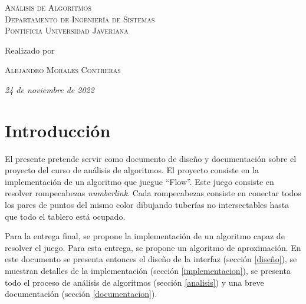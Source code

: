 \documentclass[letter,12pt]{article}
\begin{document}
\begin{titlepage}
	
	{\scshape\Large
	Análisis de Algoritmos \\
	Departamento de Ingeniería de Sistemas \\
	Pontificia Universidad Javeriana \\
	}  %
	
	\vspace*{3\baselineskip} %
	
	
	Realizado por
	
	\vspace{0.5\baselineskip} %
	
	{\scshape\Large Alejandro Morales Contreras} %
	
	\vspace{1\baselineskip} %
	
	\textit{24 de noviembre de 2022} %
	
	\vfill
	
\end{titlepage}

\newpage

\tableofcontents

\newpage

\section{Introducción} \label{introduccion}

El presente pretende servir como documento de diseño y documentación sobre el proyecto del curso de análisis de algoritmos. El proyecto consiste en la implementación de un algoritmo que juegue ``Flow''. Este juego consiste en resolver rompecabezas \emph{numberlink}. Cada rompecabezas consiste en conectar todos los pares de puntos del mismo color dibujando tuberías no intersectables hasta que todo el tablero está ocupado. \par

Para la entrega final, se propone la implementación de un algoritmo capaz de resolver el juego. Para esta entrega, se propone un algoritmo de aproximación. En este documento se presenta entonces el diseño de la interfaz (sección \ref{diseño}), se muestran detalles de la implementación (sección \ref{implementacion}), se presenta todo el proceso de análisis de algoritmos (sección \ref{analisis}) y una breve documentación (sección \ref{documentacion}). \par
\end{document}
